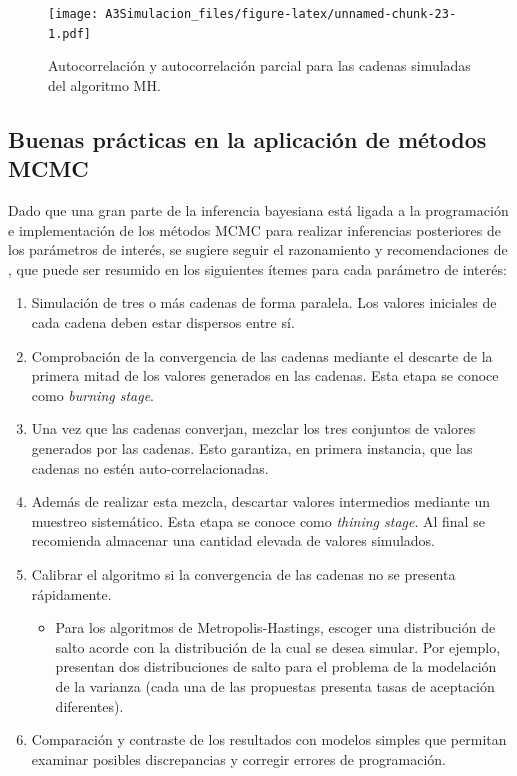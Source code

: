 \documentclass[
  10pt,
  spanish,
]{book}
\providecommand{\tightlist}{%
  \setlength{\itemsep}{0pt}\setlength{\parskip}{0pt}}
\theoremstyle{definition}
\theoremstyle{definition}
\theoremstyle{definition}
\theoremstyle{definition}
\theoremstyle{remark}
\begin{document}
\begin{figure}
\centering
\texttt{[image: A3Simulacion\_files/figure-latex/unnamed-chunk-23-1.pdf]}
\caption{\label{fig:unnamed-chunk-23}Autocorrelación y autocorrelación parcial para las cadenas simuladas del algoritmo MH.}
\end{figure}

\hypertarget{buenas-pruxe1cticas-en-la-aplicaciuxf3n-de-muxe9todos-mcmc}{%
\subsection{Buenas prácticas en la aplicación de métodos MCMC}\label{buenas-pruxe1cticas-en-la-aplicaciuxf3n-de-muxe9todos-mcmc}}

Dado que una gran parte de la inferencia bayesiana está ligada a la programación e implementación de los métodos MCMC para realizar inferencias posteriores de los parámetros de interés, se sugiere seguir el razonamiento y recomendaciones de \citet{GelShir2010}, que puede ser resumido en los siguientes ítemes para cada parámetro de interés:

\begin{enumerate}
\def\labelenumi{\arabic{enumi}.}
\tightlist
\item
  Simulación de tres o más cadenas de forma paralela. Los valores iniciales de cada cadena deben estar dispersos entre sí.
\item
  Comprobación de la convergencia de las cadenas mediante el descarte de la primera mitad de los valores generados en las cadenas. Esta etapa se conoce como \emph{burning stage}.
\item
  Una vez que las cadenas converjan, mezclar los tres conjuntos de valores generados por las cadenas. Esto garantiza, en primera instancia, que las cadenas no estén auto-correlacionadas.
\item
  Además de realizar esta mezcla, descartar valores intermedios mediante un muestreo sistemático. Esta etapa se conoce como \emph{thining stage}. Al final se recomienda almacenar una cantidad elevada de valores simulados.
\item
  Calibrar el algoritmo si la convergencia de las cadenas no se presenta rápidamente.

  \begin{itemize}
  \tightlist
  \item
    Para los algoritmos de Metropolis-Hastings, escoger una distribución de salto acorde con la distribución de la cual se desea simular. Por ejemplo, \citet{Cepe1} presentan dos distribuciones de salto para el problema de la modelación de la varianza (cada una de las propuestas presenta tasas de aceptación diferentes).
  \end{itemize}
\item
  Comparación y contraste de los resultados con modelos simples que permitan examinar posibles discrepancias y corregir errores de programación.
\end{enumerate}
\end{document}
